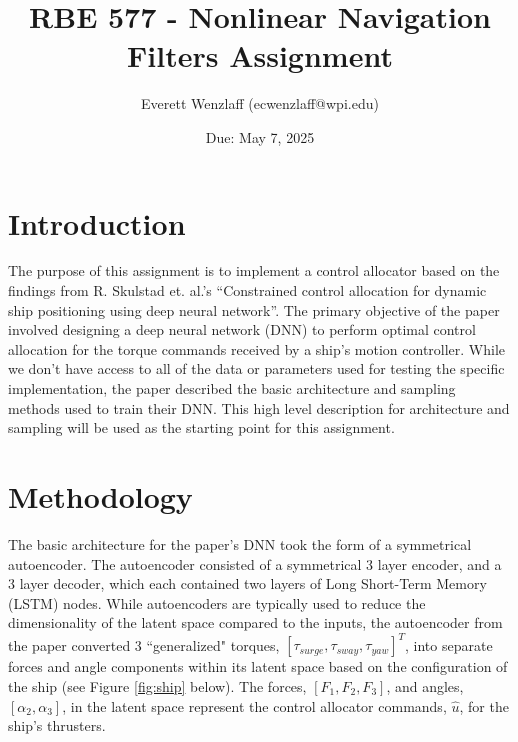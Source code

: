 \documentclass{article}
\title{RBE 577 - Nonlinear Navigation Filters Assignment}
\author{Everett Wenzlaff (ecwenzlaff@wpi.edu)}
\date{Due: May 7, 2025}
\begin{document}
\maketitle

\section{Introduction}
The purpose of this assignment is to implement a control allocator based on the findings from R. Skulstad et. al.'s ``Constrained control allocation for dynamic ship positioning using deep neural network''\cite{paper}. The primary objective of the paper involved designing a deep neural network (DNN) to perform optimal control allocation for the torque commands received by a ship's motion controller. While we don't have access to all of the data or parameters used for testing the specific implementation, the paper described the basic architecture and sampling methods used to train their DNN. This high level description for architecture and sampling will be used as the starting point for this assignment.

\section{Methodology}
The basic architecture for the paper's DNN took the form of a symmetrical autoencoder. The autoencoder consisted of a symmetrical 3 layer encoder, and a 3 layer decoder, which each contained two layers of Long Short-Term Memory (LSTM) nodes. While autoencoders are typically used to reduce the dimensionality of the latent space compared to the inputs, the autoencoder from the paper converted 3 ``generalized" torques, $\left[\tau_{surge}, \tau_{sway}, \tau_{yaw}\right]^{T}$, into separate forces and angle components within its latent space based on the configuration of the ship (see Figure \ref{fig:ship} below). The forces, $\left[F_1, F_2, F_3\right]$, and angles, $\left[\alpha_2, \alpha_3\right]$, in the latent space represent the control allocator commands, $\hat{u}$, for the ship's thrusters.
\end{document}
